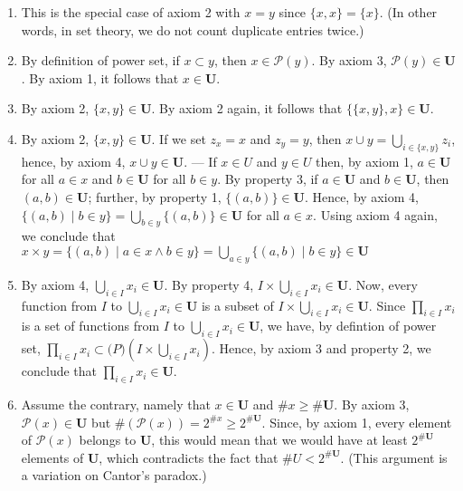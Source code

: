\documentclass[12pt]{article}
\begin{document}
\begin{enumerate}
\item This is the special case of axiom 2 with $x=y$ since $\{x,x\} = \{x\}$.  (In other words, in set theory, we do not count duplicate entries twice.)
\item By definition of power set, if $x \subset y$, then $x \in \mathcal{P} (y)$.  By axiom 3, $\mathcal{P} (y) \in \mathbf{U}$.  By axiom 1, it follows that $x \in \mathbf{U}$.
\item  By axiom 2, $\{x,y\} \in \mathbf{U}$.  By axiom 2 again, it follows that $\{\{x,y\},x\} \in \mathbf{U}$.
\item  By axiom 2, $\{x,y\} \in \mathbf{U}$.  If we set $z_x = x$ and $z_y = y$, then $x \cup y = \bigcup_{i \in \{x,y\}} z_i$, hence, by axiom 4, $x \cup y \in \mathbf{U}$. --- If $x \in U$ and $y \in U$ then, by axiom 1, $a \in \mathbf{U}$ for all $a \in x$ and $b \in \mathbf{U}$ for all $b \in y$.  By property 3, if $a \in \mathbf{U}$ and $b \in \mathbf{U}$, then $(a,b) \in \mathbf{U}$; further, by property 1, $\{(a,b)\} \in \mathbf{U}$.  Hence, by axiom 4, $\{(a,b) \mid b \in y \} = \bigcup_{b \in y} \{(a,b)\} \in \mathbf{U}$ for all $a \in x$.  Using axiom 4 again, we conclude that $x \times y = \{(a,b) \mid a \in x \wedge b \in y \} = \bigcup_{a \in y} \{(a,b) \mid b \in y \} \in \mathbf{U}$
\item  By axiom 4, $\bigcup_{i \in I} x_i \in \mathbf{U}$.  By property 4, $I \times \bigcup_{i \in I} x_i \in \mathbf{U}$.  Now, every function from $I$ to $\bigcup_{i \in I} x_i \in \mathbf{U}$ is a subset of $I \times \bigcup_{i \in I} x_i \in \mathbf{U}$.  Since $\prod_{i \in I} x_i$ is a set of functions from $I$ to $\bigcup_{i \in I} x_i \in \mathbf{U}$, we have, by defintion of power set, $\prod_{i \in I} x_i \subset \mathcal(P) (I \times \bigcup_{i \in I} x_i)$.  Hence, by axiom 3 and property 2, we conclude that $\prod_{i \in I} x_i \in \mathbf{U}$.
\item  Assume the contrary, namely that $x \in \mathbf{U}$ and $\#x \ge \#\mathbf{U}$.  By axiom 3, $\mathcal{P} (x) \in \mathbf{U}$ but $\#(\mathcal{P}(x)) = 2^{\#x} \ge 2^{\#\mathbf{U}}$.  Since, by axiom 1, every element of $\mathcal{P} (x)$ belongs to $\mathbf{U}$, this would mean that we would have at least $2^{\#\mathbf{U}}$ elements of $\mathbf{U}$, which contradicts the fact that $\#U < 2^{\#\mathbf{U}}$.  (This argument is a variation on Cantor's paradox.)
\end{enumerate}
\end{document}
